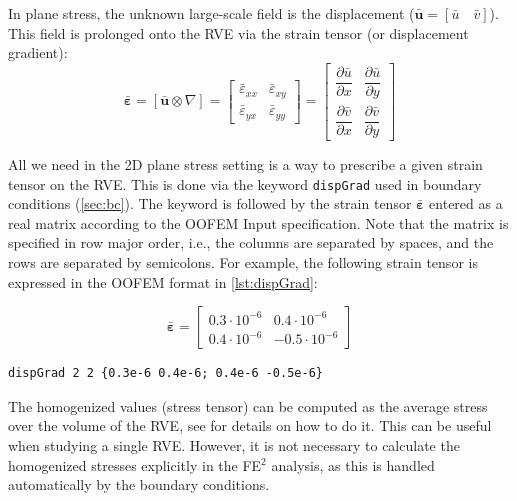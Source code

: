 \documentclass[11pt]{article}
\newcommand{\param}[1]{\texttt{#1}}
\begin{document}
In plane stress, the unknown large-scale field is the displacement ($\bm{\bar{u}} = [\bar{u} \quad \bar{v}]$). This field is prolonged onto the RVE via the strain tensor (or displacement gradient):
\begin{equation}
    \bm{\bar{\varepsilon}} = \left[ \bm{\bar{u}} \otimes \nabla \right] = 
    \begin{bmatrix}
        \bar{\varepsilon}_{xx} & \bar{\varepsilon}_{xy}\\
        \bar{\varepsilon}_{yx} & \bar{\varepsilon}_{yy} 
    \end{bmatrix}  =
    \begin{bmatrix}
        \dfrac{\partial \bar{u}}{\partial x} & \dfrac{\partial \bar{u}}{\partial y} \\
        \dfrac{\partial \bar{v}}{\partial x}  & \dfrac{\partial \bar{v}}{\partial y}  
       \end{bmatrix} 
\end{equation}

\noindent All we need in the 2D plane stress setting is a way to prescribe a given strain tensor on the RVE. This is done via the keyword \param{dispGrad} used in boundary conditions (\cref{sec:bc}). The keyword is followed by the strain tensor $\bm{\bar{\varepsilon}}$ entered as a real matrix according to the OOFEM Input specification. Note that the matrix is specified in row major order, i.e., the columns are separated by spaces, and the rows are separated by semicolons. For example, the following strain tensor is expressed in the OOFEM format in \cref{lst:dispGrad}:

\begin{equation*}
    \bm{\bar{\varepsilon}} = 
    \begin{bmatrix}
        0.3 \cdot  10^{-6} & 0.4 \cdot  10^{-6}\\
        0.4 \cdot  10^{-6} & -0.5 \cdot  10^{-6}
       \end{bmatrix}
\end{equation*}

\begin{lstlisting}[style=oofem,language=oofeminput, label=lst:dispGrad, caption={OOFEM input format for $\bm{\bar{\varepsilon}}$.}]
dispGrad 2 2 {0.3e-6 0.4e-6; 0.4e-6 -0.5e-6}
\end{lstlisting}


\noindent The homogenized values (stress tensor) can be computed as the average stress over the volume of the RVE, see \cite{PaperA} for details on how to do it. This can be useful when studying a single RVE. However, it is not necessary to calculate the homogenized stresses explicitly in the FE$^2$ analysis, as this is handled automatically by the boundary conditions.
\end{document}
